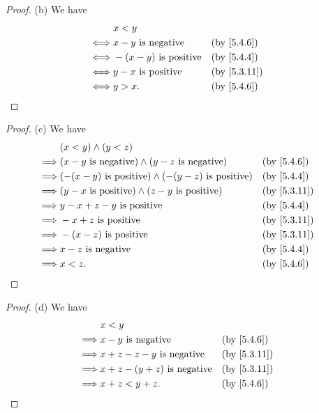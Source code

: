 \begin{proof}{(b)}
  We have
  \begin{align*}
         & x < y                                         \\
    \iff & x - y \text{ is negative}    &  & \by{5.4.6}  \\
    \iff & -(x - y) \text{ is positive} &  & \by{5.4.4}  \\
    \iff & y - x \text{ is positive}    &  & \by{5.3.11} \\
    \iff & y > x.                       &  & \by{5.4.6}
  \end{align*}
\end{proof}

\begin{proof}{(c)}
  We have
  \begin{align*}
             & (x < y) \land (y < z)                                                                \\
    \implies & (x - y \text{ is negative}) \land (y - z \text{ is negative})       &  & \by{5.4.6}  \\
    \implies & (-(x - y) \text{ is positive}) \land (-(y - z) \text{ is positive}) &  & \by{5.4.4}  \\
    \implies & (y - x \text{ is positive}) \land (z - y \text{ is positive})       &  & \by{5.3.11} \\
    \implies & y - x + z - y \text{ is positive}                                   &  & \by{5.4.4}  \\
    \implies & - x + z \text{ is positive}                                         &  & \by{5.3.11} \\
    \implies & -(x - z) \text{ is positive}                                        &  & \by{5.3.11} \\
    \implies & x - z \text{ is negative}                                           &  & \by{5.4.4}  \\
    \implies & x < z.                                                              &  & \by{5.4.6}
  \end{align*}
\end{proof}

\begin{proof}{(d)}
  We have
  \begin{align*}
             & x < y                                                \\
    \implies & x - y \text{ is negative}           &  & \by{5.4.6}  \\
    \implies & x + z - z - y \text{ is negative}   &  & \by{5.3.11} \\
    \implies & x + z - (y + z) \text{ is negative} &  & \by{5.3.11} \\
    \implies & x + z < y + z.                      &  & \by{5.4.6}
  \end{align*}
\end{proof}

